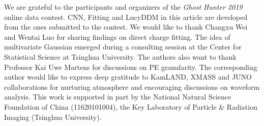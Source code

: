 \acknowledgments
We are grateful to the participants and organizers of the \textit{Ghost Hunter 2019} online data contest.  CNN, Fitting and LucyDDM in this article are developed from the ones submitted to the contest.  We would like to thank Changxu Wei and Wentai Luo for sharing findings on direct charge fitting.  The idea of multivariate Gaussian emerged during a consulting session at the Center for Statistical Science at Tsinghua University.  The authors also want to thank Professor Kai Uwe Martens for discussions on PE granularity.  The corresponding author would like to express deep gratitude to KamLAND, XMASS and JUNO collaborations for nurturing atmosphere and encouraging discussions on waveform analysis.  This work is supported in part by the National Natural Science Foundation of China (11620101004), the Key Laboratory of Particle \& Radiation Imaging (Tsinghua University). 

